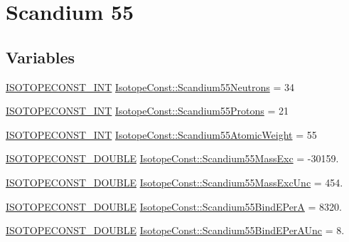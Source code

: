 \hypertarget{group___isotope_const-_scandium-_sc55}{}\section{Scandium 55}
\label{group___isotope_const-_scandium-_sc55}
\subsection*{Variables}
\begin{DoxyCompactItemize}
\item 
\mbox{\hyperlink{group___isotope_const-_macros_ga5f18360b3e99483a35c32d789e62621c}{I\+S\+O\+T\+O\+P\+E\+C\+O\+N\+S\+T\+\_\+\+I\+NT}} \mbox{\hyperlink{group___isotope_const-_scandium-_sc55_ga473dd1d84efff821a859b0cbd769fe4d}{Isotope\+Const\+::\+Scandium55\+Neutrons}} = 34
\item 
\mbox{\hyperlink{group___isotope_const-_macros_ga5f18360b3e99483a35c32d789e62621c}{I\+S\+O\+T\+O\+P\+E\+C\+O\+N\+S\+T\+\_\+\+I\+NT}} \mbox{\hyperlink{group___isotope_const-_scandium-_sc55_gaf81557236c02d2c1d6533b7aa7d4aa06}{Isotope\+Const\+::\+Scandium55\+Protons}} = 21
\item 
\mbox{\hyperlink{group___isotope_const-_macros_ga5f18360b3e99483a35c32d789e62621c}{I\+S\+O\+T\+O\+P\+E\+C\+O\+N\+S\+T\+\_\+\+I\+NT}} \mbox{\hyperlink{group___isotope_const-_scandium-_sc55_gad3fbb28c400ce0092cdc05a8d8a56a73}{Isotope\+Const\+::\+Scandium55\+Atomic\+Weight}} = 55
\item 
\mbox{\hyperlink{group___isotope_const-_macros_ga8f45a7272ce02c0b4c65c44636ed719a}{I\+S\+O\+T\+O\+P\+E\+C\+O\+N\+S\+T\+\_\+\+D\+O\+U\+B\+LE}} \mbox{\hyperlink{group___isotope_const-_scandium-_sc55_ga759dd57f125cdc792574c09b71a98a5f}{Isotope\+Const\+::\+Scandium55\+Mass\+Exc}} = -\/30159.
\item 
\mbox{\hyperlink{group___isotope_const-_macros_ga8f45a7272ce02c0b4c65c44636ed719a}{I\+S\+O\+T\+O\+P\+E\+C\+O\+N\+S\+T\+\_\+\+D\+O\+U\+B\+LE}} \mbox{\hyperlink{group___isotope_const-_scandium-_sc55_ga52e3a930458e606491d33c4a65213996}{Isotope\+Const\+::\+Scandium55\+Mass\+Exc\+Unc}} = 454.
\item 
\mbox{\hyperlink{group___isotope_const-_macros_ga8f45a7272ce02c0b4c65c44636ed719a}{I\+S\+O\+T\+O\+P\+E\+C\+O\+N\+S\+T\+\_\+\+D\+O\+U\+B\+LE}} \mbox{\hyperlink{group___isotope_const-_scandium-_sc55_ga9a21a769f9ec182544e0539accd6c626}{Isotope\+Const\+::\+Scandium55\+Bind\+E\+PerA}} = 8320.
\item 
\mbox{\hyperlink{group___isotope_const-_macros_ga8f45a7272ce02c0b4c65c44636ed719a}{I\+S\+O\+T\+O\+P\+E\+C\+O\+N\+S\+T\+\_\+\+D\+O\+U\+B\+LE}} \mbox{\hyperlink{group___isotope_const-_scandium-_sc55_gab70823cc9502b7917060981569d4aad1}{Isotope\+Const\+::\+Scandium55\+Bind\+E\+Per\+A\+Unc}} = 8.

\end{DoxyCompactItemize}
